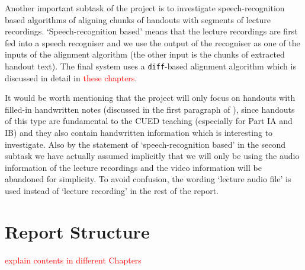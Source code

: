 Another important subtask of the project is to investigate speech-recognition based algorithms of aligning chunks of handouts with segments of lecture recordings. `Speech-recognition based' means that the lecture recordings are first fed into a speech recogniser and we use the output of the recogniser as one of the inputs of the alignment algorithm (the other input is the chunks of extracted handout text). The final system uses a \texttt{diff}-based alignment algorithm which is discussed in detail in \textcolor{red}{these chapters}.

It would be worth mentioning that the project will only focus on handouts with filled-in handwritten notes (discussed in the first paragraph of ), since handouts of this type are fundamental to the CUED teaching (especially for Part IA and IB) and they also contain handwritten information which is interesting to investigate. Also by the statement of `speech-recognition based' in the second subtask we have actually assumed implicitly that we will only be using the audio information of the lecture recordings and the video information will be abandoned for simplicity. To avoid confusion, the wording `lecture audio file' is used instead of `lecture recording' in the rest of the report.


\section{Report Structure}

\textcolor{red}{explain contents in different Chapters}


